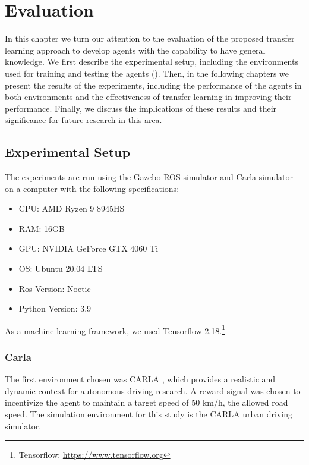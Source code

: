 
\chapter{Evaluation}
\label{cha:experiments}

In this chapter we turn our attention to the evaluation of the proposed transfer learning approach to develop agents with the capability to have general knowledge. We first describe the experimental setup, including the environments used for training and testing the agents (). Then, in the following chapters we present the results of the experiments, including the performance of the agents in both environments and the effectiveness of transfer learning in improving their performance. Finally, we discuss the implications of these results and their significance for future research in this area.


\section{Experimental Setup}
\label{sec:setup}

The experiments are run using the Gazebo ROS simulator and Carla simulator on a computer with the following specifications:
\begin{itemize}
    \item CPU: AMD Ryzen 9 8945HS 
    \item RAM: 16GB
    \item GPU: NVIDIA GeForce GTX 4060 Ti
    \item OS: Ubuntu 20.04 LTS 
    \item Ros Version: Noetic
    \item Python Version: 3.9
\end{itemize}
As a machine learning framework, we used Tensorflow 2.18.\footnote{Tensorflow: \url{https://www.tensorflow.org}}


\subsection{Carla}
\label{sec:carla}
The first environment chosen was CARLA \cite{CARLA}, which provides a realistic and dynamic context for autonomous driving research. A reward signal was chosen to incentivize the agent to maintain a target speed of 50 km/h, the allowed road speed. The simulation environment for this study is the CARLA urban driving simulator.

